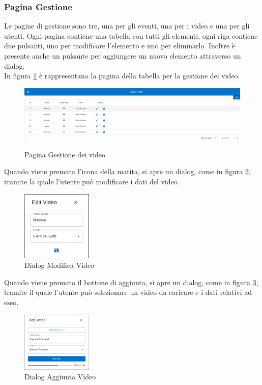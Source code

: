 \subsubsection{Pagina Gestione}
Le pagine di gestione sono tre, una per gli eventi, una per i video e una per gli utenti. Ogni pagina contiene una tabella con tutti gli elementi, ogni riga contiene due pulsanti, uno per modificare l'elemento e uno per eliminarlo. Inoltre è presente anche un pulsante per aggiungere un nuovo elemento attraverso un dialog.\\
In figura \ref{fig:gestionevideo} è rappresentana la pagina della tabella per la gestione dei video.
\begin{figure}[H]
    \centering
    \includegraphics[width=1\textwidth]{images/interface/videotable.png}
    \caption{Pagina Gestione dei video}
    \label{fig:gestionevideo}
\end{figure}
Quando viene premuta l'icona della matita, si apre un dialog, come in figura \ref{fig:modifica video}, tramite la quale l'utente può modificare i dati del video.
\begin{figure}[H]
    \centering
    \includegraphics[width=0.3\textwidth]{images/interface/editvideo.png}
    \caption{Dialog Modifica Video}
    \label{fig:modifica video}
\end{figure}
Quando viene premuto il bottone di aggiunta, si apre un dialog, come in figura \ref{fig:aggiuntavideo}, tramite il quale l'utente può selezionare un video da caricare e i dati relativi ad esso.
\begin{figure}[H]
    \centering
    \includegraphics[width=0.3\textwidth]{images/interface/addvideo.png}
    \caption{Dialog Aggiunta Video}
    \label{fig:aggiuntavideo}
\end{figure}
